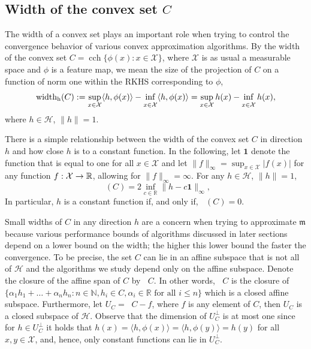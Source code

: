 \documentclass[10pt]{amsart}
\theoremstyle{definition}\newtheorem{defi}[theo]{Definition}\newtheorem{rema}[theo]{Remark}\newtheorem{exam}[theo]{Example}\newtheorem{exem}[theo]{Example}\newtheorem{nota}[theo]{Notation}
\theoremstyle{remark}
\DeclareMathOperator*{\infd}{inf\vphantom{p}}
\DeclareMathOperator{\cch}{cch}
\DeclareMathOperator{\caff}{\overline{aff}}
\DeclareMathOperator{\diamh}{{width}_h}
\newcommand{\R}{\mathbb{R}}
\newcommand{\bbN}{\mathbb{N}}
\newcommand{\X}{\mathcal{X}}
\newcommand{\cH}{\mathcal{H}}
\newcommand{\mean}{\mathfrak{m}}
\renewcommand*{\to}{\mathchoice{\longrightarrow}{\rightarrow}{\rightarrow}{\rightarrow}}
\begin{document}
\subsection{Width of the convex set \texorpdfstring{$C$}{C}} \label{sec:diameter}
The width of a convex set plays an important role when trying to control the convergence behavior of various convex approximation algorithms. By the width of the convex set $C = \cch\{\phi(x) : x \in \X\}$, where $\X$ is as usual a measurable space and $\phi$ is a feature map, we mean the size of the projection of $C$ on a function of norm one within the RKHS corresponding to $\phi$,
\[
\diamh(C) := \sup_{x\in \X} \langle h, \phi(x) \rangle - \infd_{x\in \X} \langle h, \phi(x) \rangle =
\sup_{x\in \X} h(x) - \infd_{x\in \X} h(x),
\]
where $h \in \cH$, $\|h\| =1 $.

There is a simple relationship between the width of the convex set $C$ in direction $h$ and how close $h$ is to a constant function. In the following, let $\bm 1$ denote the function that is equal to one for all $x\in \X$ and let $\| f\|_\infty =
\sup_{x\in \X} |f(x)|$ for any function $f: \X \to \R$, allowing for $\|f\|_\infty = \infty$. For any $h\in \cH$, $\|h \| =1$,
\begin{equation}\label{eq:constant_vs_diameter}
\diamh(C) = 2 \inf_{c\in \R} \|h - c \bm 1\|_\infty,
\end{equation}
In particular, $h$ is a constant function if, and only if, $\diamh(C) = 0$.

Small widths of $C$ in any direction $h$ are a concern when trying to approximate $\mean$ because various performance bounds of algorithms discussed in later sections depend on a lower bound on the width; the higher this lower bound the faster the convergence. To be precise, the set $C$ can lie in an affine subspace that is not all of $\cH$ and the algorithms we study depend only on the affine subspace. Denote the closure of the affine span of $C$ by $\caff C$. In other words, $\caff C$ is the closure of $\{\alpha_1 h_1 + \dots + \alpha_n h_n : n\in \bbN, h_i \in C, \alpha_i \in \R \text{ for all } i \leq n \}$ which is a closed affine subspace. Furthermore, let $U_C = \caff C - f$, where $f$ is any element of $C$, then $U_C$ is a closed subspace of $\cH$. Observe that the dimension of $U_C^\perp$ is at most one since for $h \in U_C^\perp$ it holds that $h(x) = \langle h,\phi(x) \rangle = \langle h, \phi(y) \rangle = h(y)$ for all $x,y \in \X$, and, hence, only constant functions can lie in $U_C^\perp$.
\end{document}

